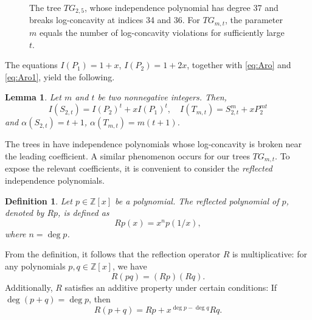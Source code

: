 \documentclass[reqno]{amsart}
\newtheorem{definition}{Definition}
\newtheorem{lemma}{Lemma}
\newcommand{\Z}{\mathbb{Z}}
\begin{document}
\begin{figure}[bth]
\caption{The tree $TG_{2,5}$, whose independence polynomial has degree 37 and  breaks log-concavity at indices 34 and 36. For $TG_{m,t}$, the parameter $m$ equals the number of log-concavity violations for sufficiently large $t$.}\label{fig1}
\end{figure}


The equations $I(P_1) = 1+x$, $I(P_2) = 1+2x$, together with \eqref{eq:Aro} and \eqref{eq:Aro1}, yield the following.
\begin{lemma}\label{l:degs}
Let $m$ and $t$ be two nonnegative integers. Then,
\begin{equation}\label{eq:ST}
I(S_{2,t})=I(P_2)^t+xI(P_1)^t,\quad I(T_{m,t})=S_{2,t}^m+xP_2^{mt}
\end{equation}
and $\alpha(S_{2,t})=t+1$, $\alpha(T_{m,t})=m(t+1)$.
\end{lemma}	

The trees in \cite{Kadrawi,Kadrawi2,Ramos} have independence polynomials whose log-concavity is broken near the leading coefficient. A similar phenomenon occurs for our trees $TG_{m,t}$. To expose the relevant coefficients, it is convenient to consider the \emph{reflected} independence polynomials.

\begin{definition}
  Let $p \in \Z[x]$ be a polynomial. The \emph{reflected polynomial} of $p$, denoted by $Rp$, is defined as
  \[
  Rp(x) = x^n p(1/x),
  \]
  where $n = \deg p$.
\end{definition}

From the definition, it follows that the reflection operator $R$ is multiplicative: for any polynomials $p, q \in \Z[x]$, we have
\[
R(pq) = (Rp)(Rq).
\]
Additionally, $R$ satisfies an additive property under certain conditions: If $\deg(p+q) = \deg p$, then
\[
R(p+q) = Rp + x^{\deg p - \deg q} Rq.
\]
\end{document}
